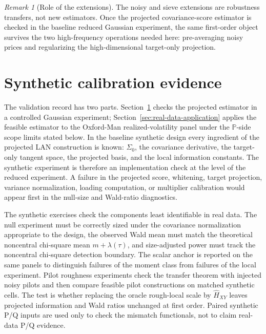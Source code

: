 \documentclass[11pt,a4paper]{amsart}
\theoremstyle{plain}
\theoremstyle{definition}
\theoremstyle{remark}
\newtheorem{remark}[theorem]{Remark}
\newcommand{\PP}{\mathbb{P}}
\begin{document}
\begin{remark}[Role of the extensions]
The noisy and sieve extensions are robustness transfers, not new estimators.  Once the projected
covariance-score estimator is checked in the baseline reduced Gaussian experiment, the same
first-order object survives the two high-frequency operations needed here: pre-averaging noisy
prices and regularizing the high-dimensional target-only projection.
\end{remark}

\section{Synthetic calibration evidence}\label{sec:synthetic-validation}

The validation record has two parts.  Section~\ref{sec:synthetic-validation} checks the projected
estimator in a controlled Gaussian experiment; Section~\ref{sec:real-data-application} applies the feasible estimator to the
Oxford-Man realized-volatility panel under the \(\PP\)-side scope limits stated below.  In the
baseline synthetic design every ingredient of the projected LAN construction is known:
\(\Sigma_0\), the covariance derivative, the target-only tangent space, the projected basis, and the
local information constants.  The synthetic experiment is therefore an implementation check at the
level of the reduced experiment.  A failure in the projected score, whitening, target projection,
variance normalization, loading computation, or multiplier calibration would appear first in the
null-size and Wald-ratio diagnostics.

The synthetic exercises check the components least identifiable in real data.  The null experiment
must be correctly sized under the covariance normalization appropriate to the design, the observed
Wald mean must match the theoretical noncentral chi-square mean \(m+\lambda(\tau)\), and
size-adjusted power must track the noncentral chi-square detection boundary.  The scalar anchor is
reported on the same panels to distinguish failures of the moment class from failures of the local
experiment.  Pilot roughness experiments check the transfer theorem with injected noisy pilots and
then compare feasible pilot constructions on matched synthetic cells.  The test is whether
replacing the oracle rough-local scale by \(\widehat H_{XY}\) leaves projected information and Wald
ratios unchanged at first order.  Paired synthetic P/Q inputs are used only to check the mismatch
functionals, not to claim real-data P/Q evidence.
\end{document}
